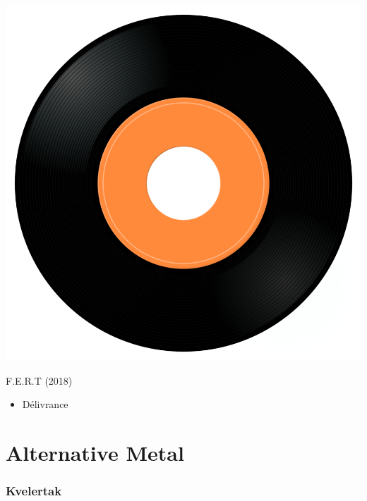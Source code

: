 \begin{minipage}[t]{0.25\textwidth}
\captionsetup{type=figure}
\includegraphics[width=\textwidth]{Images/cover.png}
\caption*{F.E.R.T (2018)}
\end{minipage}
\begin{minipage}[t]{0.25\textwidth}\vspace{0pt}
\begin{itemize}[nosep,leftmargin=1em,labelwidth=*,align=left]
	\setlength{\itemsep}{0pt}
	\item Délivrance
\end{itemize}
\end{minipage}



\section{Alternative Metal}

\subsubsection{Kvelertak}

